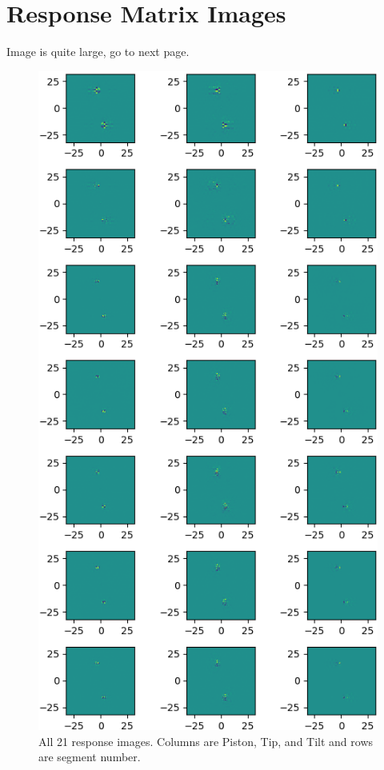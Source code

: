 
\chapter{Response Matrix Images} %

\label{AppendixA} %

Image is quite large, go to next page.

\begin{figure}
    \centering
    \includegraphics{Figures/RM.png}
    \caption{All 21 response images. Columns are Piston, Tip, and Tilt and rows are segment number.}
    \label{fig:RM_array}
\end{figure}